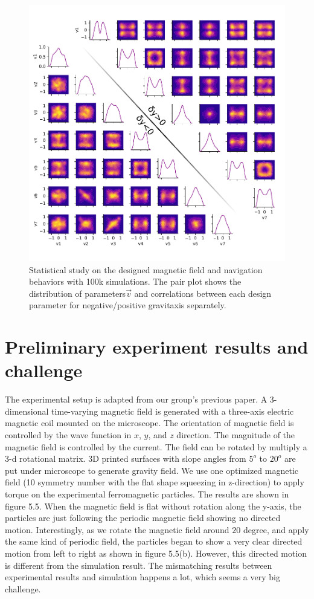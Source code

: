  
 \begin{figure}[p]
\centering
\includegraphics[width=16cm]{figures/5_4.pdf}
\caption{ Statistical study on the designed magnetic field and navigation behaviors with 100k simulations. The pair plot shows the distribution of parameters$\vec{v}$ and correlations between each design parameter for negative/positive gravitaxis separately.}
\label{fig:1}
\end{figure}
 
 
 
 \section{Preliminary experiment results and challenge}
 The experimental setup is adapted from our group's previous paper. \autocite{fei2018magneto, fei2019magneto} A 3-dimensional time-varying magnetic field is generated with a three-axis electric magnetic coil mounted on the microscope. The orientation of magnetic field is controlled by the wave function in $x$, $y$, and $z$ direction. The magnitude of the magnetic field is controlled by the current. The field can be rotated by multiply a 3-d rotational matrix. 3D printed  surfaces with slope angles from $5^o$ to  $20^o$ are put under microscope to generate gravity field. We use one optimized magnetic field (10 symmetry number with the flat shape  squeezing in z-direction) to apply torque on the experimental ferromagnetic particles. The results are shown in figure 5.5. When the magnetic field is flat without rotation along the y-axis, the particles are just following the periodic magnetic field showing no directed motion. Interestingly, as we rotate the magnetic field around $20$ degree, and apply the same kind of periodic field, the particles began to show a very clear directed motion from left to right as shown in figure 5.5(b). However, this directed motion is different from the simulation result. The mismatching results between experimental results and simulation happens a lot, which seems a very big challenge. 
 
